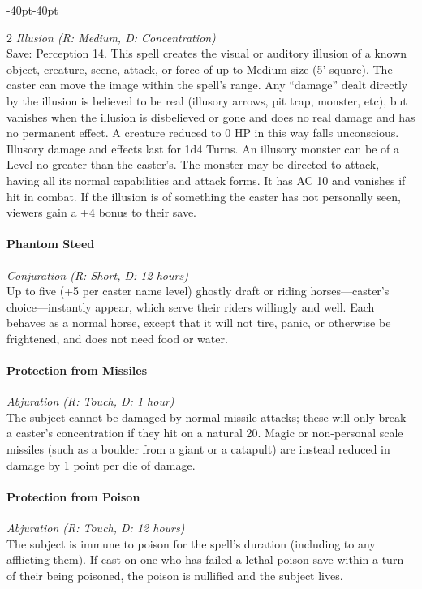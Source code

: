 \documentclass{book}
\begin{document}
\begin{adjustwidth}{-40pt}{-40pt}
\begin{multicols}{2}
\emph{Illusion (R: Medium, D: Concentration)}\\
Save: Perception 14. This spell creates the visual or auditory illusion
of a known object, creature, scene, attack, or force of up to Medium
size (5' square). The caster can move the image within the spell's
range. Any ``damage'' dealt directly by the illusion is believed to be
real (illusory arrows, pit trap, monster, etc), but vanishes when the
illusion is disbelieved or gone and does no real damage and has no
permanent effect. A creature reduced to 0 HP in this way falls
unconscious. Illusory damage and effects last for 1d4 Turns. An illusory
monster can be of a Level no greater than the caster's. The monster may
be directed to attack, having all its normal capabilities and attack
forms. It has AC 10 and vanishes if hit in combat. If the illusion is of
something the caster has not personally seen, viewers gain a +4 bonus to
their save.

\paragraph{Phantom Steed}\label{phantom-steed}

\emph{Conjuration (R: Short, D: 12 hours)}\\
Up to five (+5 per caster name level) ghostly draft or riding
horses---caster's choice---instantly appear, which serve their riders
willingly and well. Each behaves as a normal horse, except that it will
not tire, panic, or otherwise be frightened, and does not need food or
water.

\paragraph{Protection from Missiles}\label{protection-from-missiles}

\emph{Abjuration (R: Touch, D: 1 hour)}\\
The subject cannot be damaged by normal missile attacks; these will only
break a caster's concentration if they hit on a natural 20. Magic or
non-personal scale missiles (such as a boulder from a giant or a
catapult) are instead reduced in damage by 1 point per die of damage.

\paragraph{Protection from Poison}\label{protection-from-poison}

\emph{Abjuration (R: Touch, D: 12 hours)}\\
The subject is immune to poison for the spell's duration (including to
any afflicting them). If cast on one who has failed a lethal poison save
within a turn of their being poisoned, the poison is nullified and the
subject lives.


\end{multicols}
\end{adjustwidth}
\end{document}
